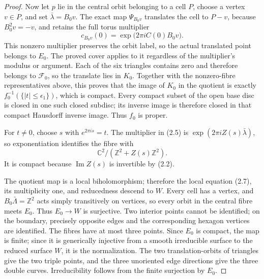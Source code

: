 \begin{proof}
Now let \(p\) lie in the central orbit belonging to a cell \(P\), choose
a vertex \(v\in P\), and set \(\bar\lambda=B_0v\).  The exact map
\(\Psi_{B_0v}\) translates the cell to \(P-v\), because \(B_0^2v=-v\),
and retains the full torus multiplier
\[
 c_{B_0v}(0)=\exp\bigl(2\pi iC(0)B_0v\bigr).
\]
This nonzero multiplier preserves the orbit label, so the actual
translated point belongs to \(E_0\).  The proved cover applies to it
regardless of the multiplier's modulus or argument.  Each of the six
triangles contains zero and therefore belongs to \(\mathcal F_0\), so
the translate lies in \(K_0\).  Together with the nonzero-fibre
representatives above, this proves that the image of \(K_0\) in the
quotient is exactly \(f_0^{-1}(\{|t|\le\epsilon_1\})\), which is compact.
Every compact subset of the open base disc is closed in one such closed
subdisc; its inverse image is therefore closed in that compact Hausdorff
inverse image.  Thus \(f_0\) is proper.

For \(t\ne0\), choose \(s\) with \(e^{2\pi is}=t\).  The multiplier in
(2.5) is \(\exp(2\pi iZ(s)\bar\lambda)\), so exponentiation identifies the
fibre with
\[
 \mathbb C^2/(\mathbb Z^2+Z(s)\mathbb Z^2).
\]
It is compact because \(\operatorname{Im}Z(s)\) is invertible by (2.2).

The quotient map is a local biholomorphism; therefore the local equation
(2.7), its multiplicity one, and reducedness descend to \(W\).  Every cell
has a vertex, and \(B_0\bar\Lambda=\mathbb Z^2\) acts simply transitively on
vertices, so every orbit in the central fibre meets \(E_0\).  Thus
\(E_0\to W\) is surjective.  Two interior points cannot be identified; on
the boundary, precisely opposite edges and the corresponding hexagon
vertices are identified.  The fibres have at most three points.  Since
\(E_0\) is compact, the map is finite; since it is generically injective
from a smooth irreducible surface to the reduced surface \(W\), it is the
normalization.  The two translation-orbits of triangles give the two triple
points, and the three unoriented edge directions give the three double
curves.  Irreducibility follows from the finite surjection by \(E_0\).


\end{proof}
